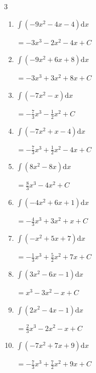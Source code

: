 \begin{multicols}{3}
\begin{enumerate}
        $\displaystyle =\frac{7}{3}x^{3}-\frac{1}{2}x^{2}-8x+ C$

  \item $\displaystyle \int \left( -9x^{2}-4x-4 \right) \mathrm{d}x$

        $\displaystyle =-3x^{3}-2x^{2}-4x+ C$

  \item $\displaystyle \int \left( -9x^{2}+6x+8 \right) \mathrm{d}x$

        $\displaystyle =-3x^{3}+3x^{2}+8x+ C$

  \item $\displaystyle \int \left( -7x^{2}-x \right) \mathrm{d}x$

        $\displaystyle =-\frac{7}{3}x^{3}-\frac{1}{2}x^{2}+ C$

  \item $\displaystyle \int \left( -7x^{2}+x-4 \right) \mathrm{d}x$

        $\displaystyle =-\frac{7}{3}x^{3}+\frac{1}{2}x^{2}-4x+ C$

  \item $\displaystyle \int \left( 8x^{2}-8x \right) \mathrm{d}x$

        $\displaystyle =\frac{8}{3}x^{3}-4x^{2}+ C$

  \item $\displaystyle \int \left( -4x^{2}+6x+1 \right) \mathrm{d}x$

        $\displaystyle =-\frac{4}{3}x^{3}+3x^{2}+x+ C$

\columnbreak %

\resetques

  \item $\displaystyle \int \left( -x^{2}+5x+7 \right) \mathrm{d}x$

        $\displaystyle =-\frac{1}{3}x^{3}+\frac{5}{2}x^{2}+7x+ C$

  \item $\displaystyle \int \left( 3x^{2}-6x-1 \right) \mathrm{d}x$

        $\displaystyle =x^{3}-3x^{2}-x+ C$

  \item $\displaystyle \int \left( 2x^{2}-4x-1 \right) \mathrm{d}x$

        $\displaystyle =\frac{2}{3}x^{3}-2x^{2}-x+ C$

  \item $\displaystyle \int \left( -7x^{2}+7x+9 \right) \mathrm{d}x$

        $\displaystyle =-\frac{7}{3}x^{3}+\frac{7}{2}x^{2}+9x+ C$


\end{enumerate}
\end{multicols}

